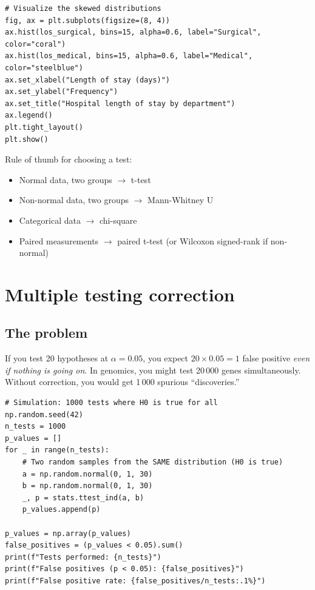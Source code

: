 \begin{verbatim}
# Visualize the skewed distributions
fig, ax = plt.subplots(figsize=(8, 4))
ax.hist(los_surgical, bins=15, alpha=0.6, label="Surgical", color="coral")
ax.hist(los_medical, bins=15, alpha=0.6, label="Medical", color="steelblue")
ax.set_xlabel("Length of stay (days)")
ax.set_ylabel("Frequency")
ax.set_title("Hospital length of stay by department")
ax.legend()
plt.tight_layout()
plt.show()
\end{verbatim}

\begin{pythontip}
Rule of thumb for choosing a test:
\begin{itemize}
  \item Normal data, two groups $\rightarrow$ t-test
  \item Non-normal data, two groups $\rightarrow$ Mann-Whitney U
  \item Categorical data $\rightarrow$ chi-square
  \item Paired measurements $\rightarrow$ paired t-test (or Wilcoxon signed-rank if non-normal)
\end{itemize}
\end{pythontip}

\section{Multiple testing correction}

\subsection{The problem}

If you test 20 hypotheses at $\alpha = 0.05$, you expect $20 \times 0.05 = 1$ false positive \emph{even if nothing is going on}. In genomics, you might test 20\,000 genes simultaneously. Without correction, you would get 1\,000 spurious ``discoveries.''

\begin{verbatim}
# Simulation: 1000 tests where H0 is true for all
np.random.seed(42)
n_tests = 1000
p_values = []
for _ in range(n_tests):
    # Two random samples from the SAME distribution (H0 is true)
    a = np.random.normal(0, 1, 30)
    b = np.random.normal(0, 1, 30)
    _, p = stats.ttest_ind(a, b)
    p_values.append(p)

p_values = np.array(p_values)
false_positives = (p_values < 0.05).sum()
print(f"Tests performed: {n_tests}")
print(f"False positives (p < 0.05): {false_positives}")
print(f"False positive rate: {false_positives/n_tests:.1%}")
\end{verbatim}

